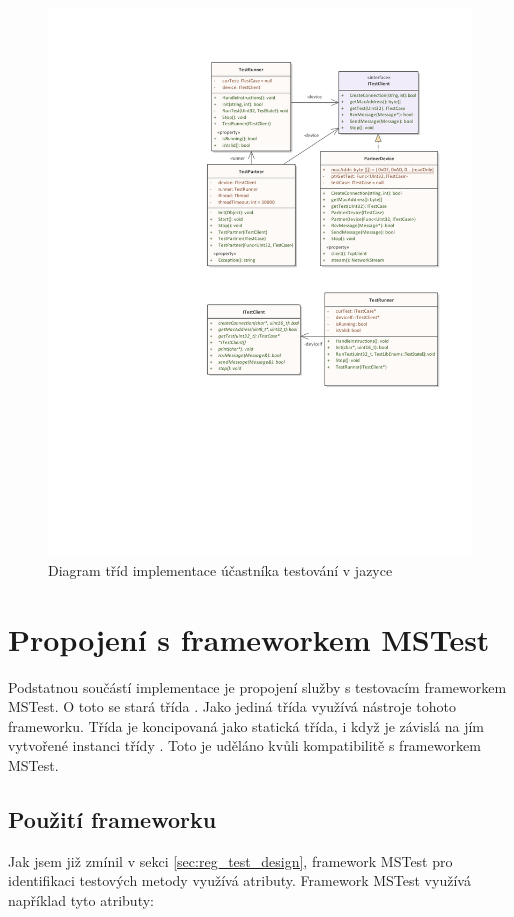 \begin{figure}[H]
    \centering 
    \includegraphics[width=\textwidth]{assets/img/class_diagram/client-csharp.pdf}
    \caption{Diagram tříd implementace účastníka testování v jazyce \protect\csharp{}}
    \label{fig:test_client_csharp}
\end{figure}


\section{Propojení s frameworkem MSTest}

Podstatnou součástí implementace je propojení služby s testovacím frameworkem MSTest. O toto se stará třída . Jako jediná třída využívá nástroje tohoto frameworku. Třída je koncipovaná jako statická třída, i když je závislá na jím vytvořené instanci třídy . Toto je uděláno kvůli kompatibilitě s frameworkem MSTest. 


\subsection{Použití frameworku}
Jak jsem již zmínil v sekci \ref{sec:reg_test_design}, framework MSTest pro identifikaci testových metody využívá atributy. Framework MSTest využívá například tyto atributy:

